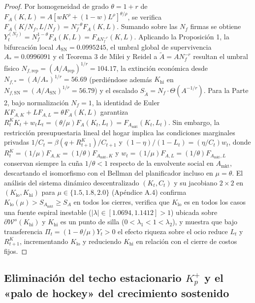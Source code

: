 \documentclass[11pt,letterpaper]{article}
\theoremstyle{plain}
\begin{document}
\begin{proof}
Por homogeneidad de grado $\theta=1+r$ de $F_A(K,L)=A[wK^\rho+(1-w)L^\rho]^{\theta/\rho}$, se verifica $F_A(K/N_f,L/N_f)=N_f^{-\theta}F_A(K,L)$. Sumando sobre las $N_f$ firmas se obtiene $Y_t^{(N_f)}=N_f^{1-\theta}F_A(K,L)=F_{AN_f^{-r}}(K,L)$. Aplicando la Proposición 1, la bifurcación local $A_{\mathrm{SN}}=0.0995245$, el umbral global de supervivencia $A_*=0.0996091$ y el Teorema 3 de Milei y Reidel a $\widetilde{A}=AN_f^{-r}$ resultan el umbral físico $N_{f,\mathrm{rep}}=(A/A_{\mathrm{rep}})^{1/r}=104.17$, la extinción económica desde $N_{f,*}=(A/A_*)^{1/r}=56.69$ (perdiéndose además $K_{\mathrm{hi}}$ en $N_{f,\mathrm{SN}}=(A/A_{\mathrm{SN}})^{1/r}=56.79$) y el escalado $S_{\widetilde{A}}=N_f\cdot\Theta(A^{-1/r})$. Para la Parte 2, bajo normalización $N_f=1$, la identidad de Euler $KF_{A,K}+LF_{A,L}=\theta F_A(K,L)$ garantiza $R_t^K K_t + w_t L_t = (\theta/\mu)F_A(K_t,L_t)=F_{A_{\mathrm{mkt}}}(K_t,L_t)$. Sin embargo, la restricción presupuestaria lineal del hogar implica las condiciones marginales privadas $1/C_t = \beta(q+R_{t+1}^K)/C_{t+1}$ y $(1-\eta)/(1-L_t)=(\eta/C_t)w_t$, donde $R_t^K=(1/\mu)F_{A,K}=(1/\theta)F_{A_{\mathrm{mkt}},K}$ y $w_t=(1/\mu)F_{A,L}=(1/\theta)F_{A_{\mathrm{mkt}},L}$ conservan siempre la cuña $1/\theta<1$ respecto de la envolvente social en $A_{\mathrm{mkt}}$, descartando el isomorfismo con el Bellman del planificador incluso en $\mu=\theta$. El análisis del sistema dinámico descentralizado $(K_t,C_t)$ y su jacobiano $2\times 2$ en $(K_{\mathrm{lo}}, K_{\mathrm{hi}})$ para $\mu\in\{1.5,1.8,2.0\}$ (Apéndice A.4) confirma $K_{\mathrm{lo}}(\mu) > S_{A_{\mathrm{mkt}}} \ge S_A$ en todos los cierres, verifica que $K_{\mathrm{lo}}$ es en todos los casos una fuente espiral inestable ($|\lambda|\in[1.0694, 1.1412]>1$) ubicada sobre $\partial\mathcal{W}^s(K_{\mathrm{hi}})$ y $K_{\mathrm{hi}}$ es un punto de silla ($0<\lambda_1<1<\lambda_2$), y muestra que bajo transferencia $\Pi_t=(1-\theta/\mu)Y_t>0$ el efecto riqueza sobre el ocio reduce $L_t$ y $R_{t+1}^K$, incrementando $K_{\mathrm{lo}}$ y reduciendo $K_{\mathrm{hi}}$ en relación con el cierre de costos fijos.
\end{proof}

\subsection{\texorpdfstring{Eliminación del techo estacionario $K_p^+$ y el «palo de hockey» del crecimiento sostenido}{Eliminación del techo estacionario K\_p\^+ y el palo de hockey del crecimiento sostenido}}
\end{document}
